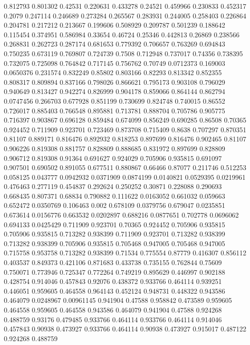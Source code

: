 0.812793 0.801302
0.42531 0.220631
0.433278 0.24521
0.459966 0.230833
0.452317 0.2079
0.247114 0.246689
0.273284 0.265567
0.283931 0.244005
0.258403 0.226864
0.204781 0.217212
0.213667 0.199606
0.508929 0.209787
0.501239 0.188642
0.115454 0.374951
0.586984 0.33654
0.46724 0.25346
0.442813 0.26869
0.238566 0.268831
0.262723 0.287174
0.681653 0.779392
0.706657 0.763269
0.694843 0.750235
0.673119 0.769807
0.724739 0.7508
0.712948 0.737017
0.74356 0.738395
0.732075 0.725098
0.764842 0.717145
0.756762 0.70749
0.0712373 0.169003
0.0650376 0.231574
0.832249 0.85802
0.803166 0.82293
0.813342 0.852355
0.808317 0.809894
0.837166 0.798026
0.866621 0.795173
0.903108 0.796029
0.940649 0.813427
0.942274 0.826999
0.904178 0.859066
0.864144 0.862794
0.0747456 0.266703
0.677928 0.851199
0.730699 0.824748
0.740015 0.86552
0.726017 0.885403
0.766548 0.895881
0.713781 0.888704
0.705786 0.905775
0.716397 0.903867
0.696128 0.859484
0.674099 0.856249
0.690285 0.86508
0.70365 0.924452
0.711909 0.923701
0.723469 0.873708
0.715409 0.8638
0.707297 0.870351
0.81107 0.889171
0.816476 0.892932
0.818253 0.897699
0.816476 0.902465
0.81107 0.906226
0.819308 0.881757
0.828809 0.888685
0.831972 0.897699
0.828809 0.906712
0.819308 0.91364
0.691627 0.924029
0.705906 0.935815
0.691097 0.907501
0.690502 0.891055
0.677511 0.880867
0.66466 0.87077
0.211746 0.512253
0.058125 0.043777
0.0942932 0.0371909
0.0874199 0.0140821
0.0529395 0.0219961
0.476463 0.277119
0.454837 0.292624
0.250252 0.30871
0.228088 0.290693
0.668435 0.807371
0.68834 0.790882
0.111622 0.0163052
0.661032 0.059663
0.652472 0.0350769
0.106463 0.002
0.678109 0.0379756
0.679047 0.0235851
0.673614 0.0156776
0.663532 0.0202897
0.688216 0.0877651
0.702778 0.0696062
0.694133 0.0425429
0.711909 0.923701
0.70365 0.924452
0.705906 0.935815
0.705906 0.935815
0.713282 0.938399
0.711909 0.923701
0.713282 0.938399
0.713282 0.938399
0.705906 0.935815
0.705468 0.947005
0.705468 0.947005
0.715758 0.953758
0.713282 0.938399
0.71534 0.775554
0.87779 0.416307
0.856112 0.403537
0.849373 0.421106
0.871683 0.433738
0.735155 0.762844
0.75609 0.750071
0.773946 0.725347
0.772264 0.749219
0.895629 0.446997
0.902188 0.428754
0.914046 0.457843
0.92076 0.438372
0.933766 0.464114
0.939251 0.446051
0.959605 0.464558
0.964143 0.452124
0.948731 0.448322
0.943586 0.464079
0.0248967 0.00961145
0.941904 0.47588
0.958842 0.473589
0.959605 0.464558
0.959605 0.464558
0.943586 0.464079
0.941904 0.47588
0.924268 0.488759
0.93176 0.479485
0.933766 0.464114
0.933766 0.464114
0.914046 0.457843
0.90938 0.473927
0.933766 0.464114
0.90938 0.473927
0.915017 0.487122
0.924268 0.488759
